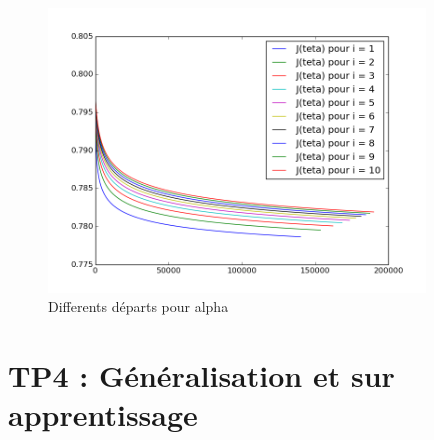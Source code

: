 \documentclass[a4paper,10pt]{report}
\begin{document}
\begin{figure}[!h]
 \centering
 \caption{Differents départs pour alpha}
 \includegraphics[width=10cm]{tp3.png}
\end{figure}

\section{TP4 : Généralisation et sur apprentissage}
\end{document}
